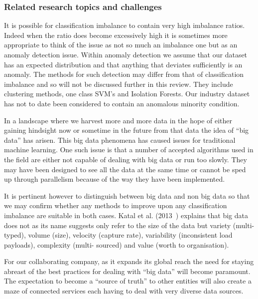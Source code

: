 \subsubsection{Related research topics and challenges} \label{sec:TopicsAndChallenges}
It is possible for classification imbalance to contain very high imbalance ratios. Indeed when the ratio does become excessively high it is sometimes more appropriate to think of the issue as not so much an imbalance one but as an anomaly detection issue. Within anomaly detection we assume that our dataset has an expected distribution and that anything that deviates sufficiently is an anomaly. The methods for such detection may differ from that of classification imbalance and so will not be discussed further in this review. They include clustering methods, one class SVM's and Isolation Forests. Our industry dataset has not to date been considered to contain an anomalous minority condition.
\par
In a landscape where we harvest more and more data in the hope of either gaining hindsight now or sometime in the future from that data the idea of ``big data'' has arisen. This big data phenomena has caused issues for traditional machine learning. One such issue is that a number of accepted algorithms used in the field are either not capable of dealing with big data or run too slowly. They may have been designed to see all the data at the same time or cannot be sped up through parallelism because of the way they have been implemented.
\par
It is pertinent however to distinguish between big data and non big data so that we may confirm whether any methods to improve upon any classification imbalance are suitable in both cases. Katal et al. (2013~\cite{katal2013big}) explains that big data does not as its name suggests only refer to the size of the data but variety (multi-typed), volume (size), velocity (capture rate), variability (inconsistent load payloads), complexity (multi- sourced) and value (worth to organisation).
\par
For our collaborating company, as it expands its global reach the need for staying abreast of the best practices for dealing with ``big data'' will become paramount. The expectation to become a ``source of truth'' to other entities will also create a maze of connected services each having to deal with very diverse data sources.
